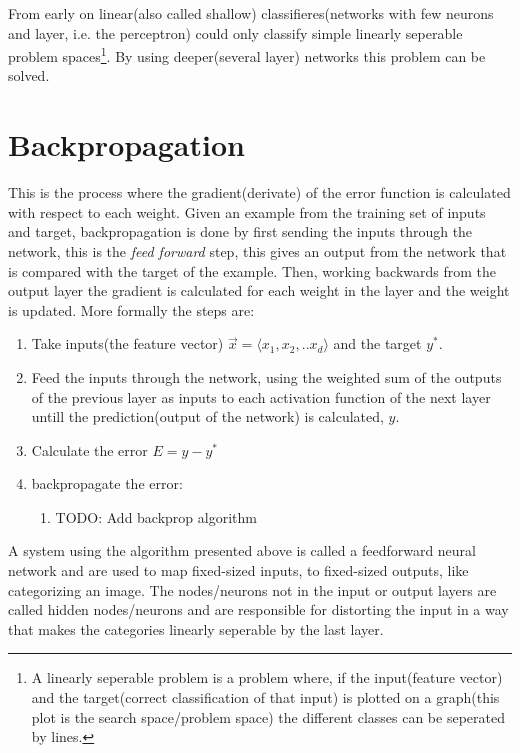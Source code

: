 \documentclass[11pt, letterpaper]{report}
\numberwithin{equation}{section}
\begin{document}
From early on linear(also called shallow) classifieres(networks with few neurons and layer, i.e. the
perceptron) could only classify simple linearly seperable problem
spaces\footnote{A linearly seperable problem is a problem where, if the
  input(feature vector) and the target(correct classification of that input) is
  plotted on a graph(this plot is the search space/problem space) the different
  classes can be seperated by lines.}. By using deeper(several layer) networks
this problem can be solved.

\section{Backpropagation}
This is the process where the gradient(derivate) of the error function is
calculated with respect to each weight. Given an example from the training set
of inputs and target, backpropagation is done by first sending the inputs through the
network, this is the \emph{feed forward} step, this gives an output from the
network that is compared with the target of the example. Then, working backwards from
the output layer the gradient is calculated for each weight in the layer and the
weight is updated. More formally the steps are:
\begin{enumerate}
\item Take inputs(the feature vector) $\vec{x} = \langle x_1,x_2,..x_d \rangle$
  and the target $y^*$.
\item Feed the inputs through the network, using the weighted sum of the outputs
  of the previous layer as inputs to each activation function of the next layer
  untill the prediction(output of the network) is calculated, $y$.
\item Calculate the error $E = y-y^*$
\item backpropagate the error:
  \begin{enumerate}
  \item TODO: Add backprop algorithm
  \end{enumerate}
\end{enumerate}

A system using the algorithm presented above is called a feedforward neural
network and are used to map fixed-sized inputs, to fixed-sized outputs, like
categorizing an image. The nodes/neurons not in the input or output layers are
called hidden nodes/neurons and are responsible for distorting the input in a
way that makes the categories linearly seperable by the last layer.
\end{document}
